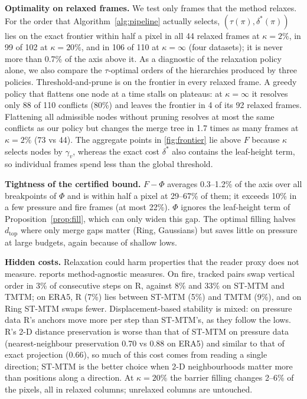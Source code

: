 \documentclass[review]{vgtc}                 %
\newcommand{\dtop}{d_{\mathrm{top}}}
\begin{document}
\textbf{Optimality on relaxed frames.} We test only frames that the method relaxes. For the order that Algorithm~\ref{alg:pipeline} actually selects, $(\tau(\pi),\delta^*(\pi))$ lies on the exact frontier within half a pixel in all 44 relaxed frames at $\kappa=2\%$, in 99 of 102 at $\kappa=20\%$, and in 106 of 110 at $\kappa=\infty$ (four datasets); it is never more than 0.7\% of the axis above it. As a diagnostic of the relaxation policy alone, we also compare the $\tau$-optimal orders of the hierarchies produced by three policies. Threshold-and-prune is on the frontier in every relaxed frame. A greedy policy that flattens one node at a time stalls on plateaus: at $\kappa=\infty$ it resolves only 88 of 110 conflicts (80\%) and leaves the frontier in 4 of its 92 relaxed frames. Flattening all admissible nodes without pruning resolves at most the same conflicts as our policy but changes the merge tree in 1.7 times as many frames at $\kappa=2\%$ (73 vs 44). The aggregate points in \cref{fig:frontier} lie above $F$ because $\kappa$ selects nodes by $\gamma_v$, whereas the exact cost $\delta^*$ also contains the leaf-height term, so individual frames spend less than the global threshold.

\textbf{Tightness of the certified bound.} $F-\Phi$ averages 0.3--1.2\% of the axis over all breakpoints of $\Phi$ and is within half a pixel at 29--67\% of them; it exceeds 10\% in a few pressure and fire frames (at most 22\%). $\Phi$ ignores the leaf-height term of Proposition~\ref{prop:fill}, which can only widen this gap. The optimal filling halves $\dtop$ where only merge gaps matter (Ring, Gaussians) but saves little on pressure at large budgets, again because of shallow lows.

\textbf{Hidden costs.} Relaxation could harm properties that the reader proxy does not measure.  reports method-agnostic measures. On fire, tracked pairs swap vertical order in 3\% of consecutive steps on R, against 8\% and 33\% on ST-MTM and TMTM; on ERA5, R (7\%) lies between ST-MTM (5\%) and TMTM (9\%), and on Ring ST-MTM swaps fewer. Displacement-based stability is mixed: on pressure data R's anchors move more per step than ST-MTM's, as they follow the lows. R's 2-D distance preservation is worse than that of ST-MTM on pressure data (nearest-neighbour preservation 0.70 vs 0.88 on ERA5) and similar to that of exact projection (0.66), so much of this cost comes from reading a single direction; ST-MTM is the better choice when 2-D neighbourhoods matter more than positions along a direction. At $\kappa=20\%$ the barrier filling changes 2--6\% of the pixels, all in relaxed columns; unrelaxed columns are untouched.
\end{document}
